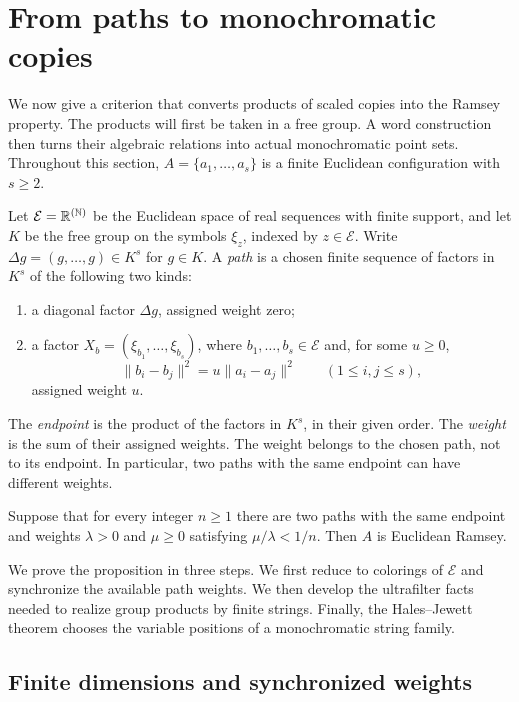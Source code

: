 \section{From paths to monochromatic copies}\label{paths:section}

We now give a criterion that converts products of scaled copies into the
Ramsey property. The products will first be taken in a free group. A
word construction then turns their algebraic relations into actual
monochromatic point sets. Throughout this section,
$A=\{a_1,\ldots,a_s\}$ is a finite Euclidean configuration with $s\ge2$.

Let $\mathcal E=\mathbb R^{(\mathbb N)}$ be the Euclidean space of real sequences with
finite support, and let $K$ be the free group on the symbols
$\xi_z$, indexed by $z\in\mathcal E$. Write
$\Delta g=(g,\ldots,g)\in K^s$ for $g\in K$.
A \emph{path} is a chosen finite sequence of factors in $K^s$ of the
following two kinds:
\begin{enumerate}
\item a diagonal factor $\Delta g$, assigned weight zero;
\item a factor $X_b=(\xi_{b_1},\ldots,\xi_{b_s})$, where
      $b_1,\ldots,b_s\in\mathcal E$ and, for some $u\ge0$,
      \[
      \|b_i-b_j\|^2=u\|a_i-a_j\|^2\qquad(1\le i,j\le s),
      \]
      assigned weight $u$.
\end{enumerate}
The \emph{endpoint} is the product of the factors in $K^s$, in their
given order. The \emph{weight} is the sum of their assigned weights.
The weight belongs to the chosen path, not to its endpoint. In
particular, two paths with the same endpoint can have different weights.

\begin{proposition}\label{paths:criterion}
Suppose that for every integer $n\ge1$ there are two paths with the
same endpoint and weights $\lambda>0$ and $\mu\ge0$ satisfying
$\mu/\lambda<1/n$. Then $A$ is Euclidean Ramsey.
\end{proposition}

We prove the proposition in three steps. We first reduce to colorings
of $\mathcal E$ and synchronize the available path weights. We then
develop the ultrafilter facts needed to realize group products by
finite strings. Finally, the Hales--Jewett theorem chooses the variable
positions of a monochromatic string family.

\subsection{Finite dimensions and synchronized weights}

